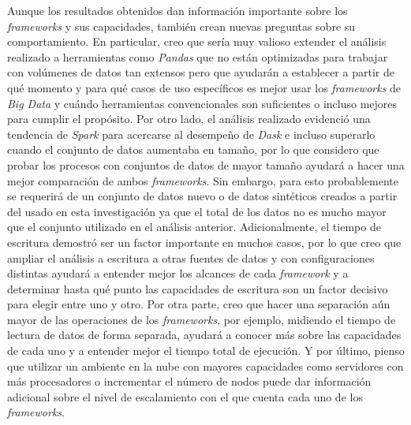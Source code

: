 Aunque los resultados obtenidos dan información importante sobre los \textit{frameworks} y sus capacidades, también crean nuevas preguntas sobre su comportamiento. En particular, creo que sería muy valioso extender el análisis realizado a herramientas como \textit{Pandas} que no están optimizadas para trabajar con volúmenes de datos tan extensos pero que ayudarán a establecer a partir de qué momento y para qué casos de uso específicos es mejor usar los \textit{frameworks} de \textit{Big Data} y cuándo herramientas convencionales son suficientes o incluso mejores para cumplir el propósito. Por otro lado, el análisis realizado evidenció una tendencia de \textit{Spark} para acercarse al desempeño de \textit{Dask} e incluso superarlo cuando el conjunto de datos aumentaba en tamaño, por lo que considero que probar los procesos con conjuntos de datos de mayor tamaño ayudará a hacer una mejor comparación de ambos \textit{frameworks}. Sin embargo, para esto probablemente se requerirá de un conjunto de datos nuevo o de datos sintéticos creados a partir del usado en esta investigación ya que el total de los datos no es mucho mayor que el conjunto utilizado en el análisis anterior. Adicionalmente, el tiempo de escritura demostró ser un factor importante en muchos casos, por lo que creo que ampliar el análisis a escritura a otras fuentes de datos y con configuraciones distintas ayudará a entender mejor los alcances de cada \textit{framework} y a determinar hasta qué punto las capacidades de escritura son un factor decisivo para elegir entre uno y otro. Por otra parte, creo que hacer una separación aún mayor de las operaciones de los \textit{frameworks}, por ejemplo, midiendo el tiempo de lectura de datos de forma separada, ayudará a conocer más sobre las capacidades de cada uno y a entender mejor el tiempo total de ejecución. Y por último, pienso que utilizar un ambiente en la nube con mayores capacidades como servidores con más procesadores o incrementar el número de nodos puede dar información adicional sobre el nivel de escalamiento con el que cuenta cada uno de los \textit{frameworks}.
